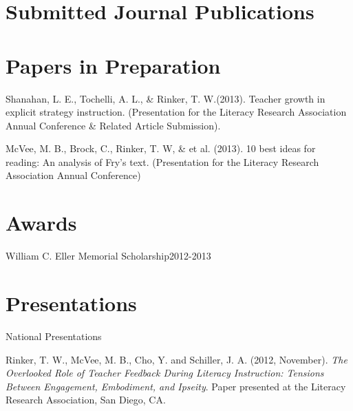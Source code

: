\section{Submitted Journal Publications}
\vspace{-.125in}
\begin{bibsection}
    \item 
\end{bibsection}


\halfblankline

\section{Papers in Preparation}
\vspace{-.1in}
\begin{bibsection}
    \item Shanahan, L. E., Tochelli, A. L., \& Rinker, T. W.(2013). Teacher growth in explicit strategy 
instruction. (Presentation for the Literacy Research Association Annual Conference \& Related Article Submission).

    \item McVee, M. B., Brock, C., Rinker, T. W, \& et al. (2013). 10 best ideas for reading: An 
analysis of Fry's text. (Presentation for the Literacy Research Association Annual Conference) 

\end{bibsection}

\section{Awards}
\begin{innerlist}
\item William C. Eller Memorial Scholarship\hfill 2012-2013
\end{innerlist}

\halfblankline

\section{Presentations}
National Presentations
\begin{innerlist}
\item Rinker, T. W., McVee, M. B., Cho, Y. and Schiller, J. A. (2012, November).  \emph{The Overlooked Role of Teacher Feedback During Literacy Instruction: Tensions Between Engagement, Embodiment, and Ipseity}.  Paper presented at the Literacy Research Association, San Diego, CA.
\end{innerlist}

